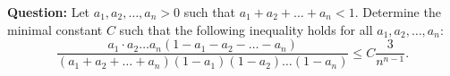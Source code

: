\begin{examplebox}
\textbf{Question:} Let $a_1, a_2, \ldots, a_n > 0$ such that $a_1 + a_2 + \ldots + a_n < 1$. Determine the minimal constant $C$ such that the following inequality holds for all $a_1, a_2, \ldots, a_n$:
$$
\frac{a_1 \cdot a_2 \ldots a_n \left(1 - a_1 - a_2 - \ldots - a_n\right)}{\left(a_1 + a_2 + \ldots + a_n\right)\left(1-a_1\right)\left(1-a_2\right) \ldots \left(1-a_n\right)} \leq C\frac{3}{n^{n-1}}.
$$
\end{examplebox}
